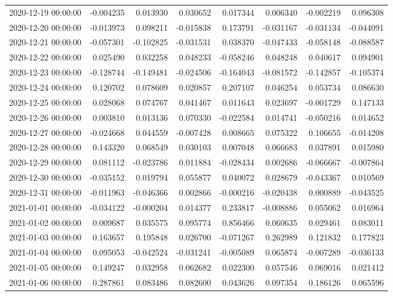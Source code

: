 \begin{tabular}{lrrrrrrr}
2020-12-19 00:00:00 & -0.004235 & 0.013930 & 0.030652 & 0.017344 & 0.006340 & -0.002219 & 0.096308 \\
2020-12-20 00:00:00 & -0.013973 & 0.098211 & -0.015838 & 0.173791 & -0.031167 & -0.031134 & -0.044091 \\
2020-12-21 00:00:00 & -0.057301 & -0.102825 & -0.031531 & 0.038370 & -0.047433 & -0.058148 & -0.088587 \\
2020-12-22 00:00:00 & 0.025490 & 0.032258 & 0.048233 & -0.058246 & 0.048248 & 0.040617 & 0.094901 \\
2020-12-23 00:00:00 & -0.128744 & -0.149481 & -0.024506 & -0.164043 & -0.081572 & -0.142857 & -0.105374 \\
2020-12-24 00:00:00 & 0.120702 & 0.078609 & 0.020857 & 0.207107 & 0.046254 & 0.053734 & 0.086630 \\
2020-12-25 00:00:00 & 0.028068 & 0.074767 & 0.041467 & 0.011643 & 0.023697 & -0.001729 & 0.147133 \\
2020-12-26 00:00:00 & 0.003810 & 0.013136 & 0.070330 & -0.022584 & 0.014741 & -0.050216 & 0.014652 \\
2020-12-27 00:00:00 & -0.024668 & 0.044559 & -0.007428 & 0.008665 & 0.075322 & 0.106655 & -0.014208 \\
2020-12-28 00:00:00 & 0.143320 & 0.068549 & 0.030103 & 0.007048 & 0.066683 & 0.037891 & 0.015980 \\
2020-12-29 00:00:00 & 0.081112 & -0.023786 & 0.011884 & -0.028434 & 0.002686 & -0.066667 & -0.007864 \\
2020-12-30 00:00:00 & -0.035152 & 0.019794 & 0.055877 & 0.040072 & 0.028679 & -0.043367 & 0.010569 \\
2020-12-31 00:00:00 & -0.011963 & -0.046366 & 0.002866 & -0.000216 & -0.020438 & 0.000889 & -0.043525 \\
2021-01-01 00:00:00 & -0.034122 & -0.000204 & 0.014377 & 0.233817 & -0.008886 & 0.055062 & 0.016964 \\
2021-01-02 00:00:00 & 0.009687 & 0.035575 & 0.095774 & 0.856466 & 0.060635 & 0.029461 & 0.083011 \\
2021-01-03 00:00:00 & 0.163657 & 0.195848 & 0.026700 & -0.071267 & 0.262989 & 0.121832 & 0.177823 \\
2021-01-04 00:00:00 & 0.095053 & -0.042524 & -0.031241 & -0.005089 & 0.065874 & -0.007289 & -0.036133 \\
2021-01-05 00:00:00 & 0.149247 & 0.032958 & 0.062682 & 0.022300 & 0.057546 & 0.069016 & 0.021412 \\
2021-01-06 00:00:00 & 0.287861 & 0.083486 & 0.082600 & 0.043626 & 0.097354 & 0.186126 & 0.065596 \\

\end{tabular}
